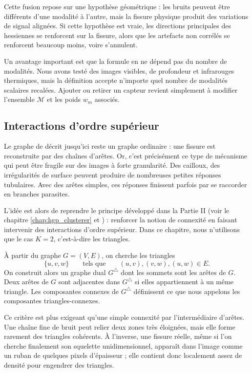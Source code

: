 Cette fusion repose sur une hypothèse géométrique : les bruits peuvent être différents d'une modalité à l'autre, mais la fissure physique produit des variations de signal alignées. Si cette hypothèse est vraie, les directions principales des hessiennes se renforcent sur la fissure, alors que les artefacts non corrélés se renforcent beaucoup moins, voire s'annulent. 

Un avantage important est que la formule en  ne dépend pas du nombre de modalités. Nous avons testé des images visibles, de profondeur et infrarouges thermiques, mais la définition accepte n'importe quel nombre de modalités scalaires recalées. Ajouter ou retirer un capteur revient simplement à modifier l'ensemble $\mathcal M$ et les poids $w_m$ associés.

\subsection{Interactions d'ordre supérieur}
\label{subsec:chapIII_interactions_ordre_superieur}

Le graphe de \Frangi{} décrit jusqu'ici reste un graphe ordinaire : une fissure est reconstruite par des chaînes d'arêtes. Or, c'est précisément ce type de mécanisme qui peut être fragile sur des images à forte granularité. Des cailloux, des irrégularités de surface peuvent produire de nombreuses petites réponses tubulaires. Avec des arêtes simples, ces réponses finissent parfois par se raccorder en branches parasites.

L'idée est alors de reprendre le principe développé dans la Partie II (voir le chapitre \ref{chap:hgp_clusterer} et \cite{BibiAppliedNetworkScience}) : renforcer la notion de connexité en faisant intervenir des interactions d'ordre supérieur. Dans ce chapitre, nous n'utilisons que le cas $K=2$, c'est-à-dire les triangles. %

À partir du graphe $G=(V,E)$, on cherche les triangles
\[
    \{u,v,w\}
    \qquad\text{tels que}\qquad
    (u,v),(v,w),(u,w)\in E.
\]
On construit alors un graphe dual $G^\triangle$ dont les sommets sont les arêtes de $G$. Deux arêtes de $G$ sont adjacentes dans $G^\triangle$ si elles appartiennent à un même triangle. Les composantes connexes de $G^\triangle$ définissent ce que nous appelons les composantes triangles-connexes.

Ce critère est plus exigeant qu'une simple connexité par l'intermédiaire d'arêtes. Une chaîne fine de bruit peut relier deux zones très éloignées, mais elle forme rarement des triangles cohérents. À l'inverse, une fissure réelle, même si l'on cherche finalement son squelette unidimensionnel, apparaît dans l'image comme un ruban de quelques pixels d'épaisseur ; elle contient donc localement assez de densité pour engendrer des triangles. 

